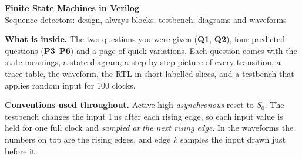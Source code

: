 \documentclass[10pt,a4paper]{article}
\begin{document}
\begin{center}
{\LARGE\bfseries Finite State Machines in Verilog}\\[3pt]
{\large Sequence detectors: design, always blocks, testbench, diagrams and waveforms}
\end{center}
\vspace{-2pt}
\begin{tcolorbox}[colback=black!3,colframe=black!40,boxrule=0.4pt,arc=2pt]
\small
\textbf{What is inside.} The two questions you were given (\textbf{Q1}, \textbf{Q2}),
four predicted questions (\textbf{P3}--\textbf{P6}) and a page of quick variations.
Each question comes with the state meanings, a state diagram, a step-by-step picture of every
transition, a trace table, the waveform, the RTL in short labelled slices, and a testbench
that applies random input for 100 clocks.

\textbf{Conventions used throughout.} Active-high \emph{asynchronous} reset to $S_0$.
The testbench changes the input 1\,ns after each rising edge, so each input value
is held for one full clock and \emph{sampled at the next rising edge}. In the waveforms
the numbers on top are the rising edges, and edge $k$ samples the input drawn just before it.
\end{tcolorbox}

\tableofcontents
\end{document}
